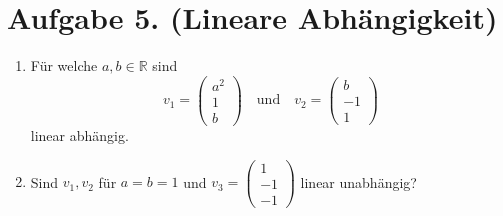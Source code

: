 \documentclass[german,12pt]{homework}
\newcommand{\RR}{\mathbb{R}}
\begin{document}
    \section*{Aufgabe 5. (Lineare Abhängigkeit)}

    \begin{problem}
        \begin{enumerate}
            \item Für welche \(a, b \in \RR\) sind
            \[v_1 = \begin{pmatrix}a^2\\1\\b\end{pmatrix} \quad \text{und}
            \quad v_2 = \begin{pmatrix}b\\-1\\1\end{pmatrix}\]
            linear abhängig.
            \item Sind \(v_1, v_2\) für \(a = b = 1\) und \(v_3 =
            \begin{pmatrix}1\\-1\\-1\end{pmatrix}\) linear unabhängig?
        \end{enumerate}
    \end{problem}
\end{document}
